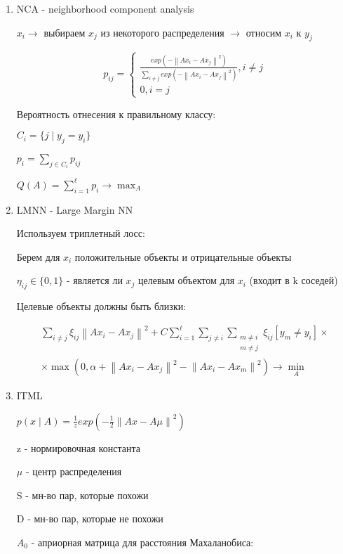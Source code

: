 \documentclass[a4paper, 12pt]{article}
\newcommand\norm[1]{\left\lVert#1\right\rVert}
\begin{document}
\begin{enumerate}
    \item NCA - neighborhood component analysis
    
    $x_i \rightarrow$ выбираем $x_j$ из некоторого распределения
    $\rightarrow$ относим $x_i$ к $y_j$

    \[p_{ij} = 
    \begin{cases}
        \frac{exp(- \norm{Ax_i - Ax_j}^2)}
        {\sum_{i \neq j} exp(- \norm{Ax_i - Ax_j}^2)}, i \neq j \\
        0, i = j
    \end{cases}\]

    Вероятность отнесения к правильному классу:

    $C_i = \{j \mid y_j = y_i\}$

    $p_i = \sum_{j \in C_i}p_{ij}$

    $Q(A) = \sum_{i = 1}^{\ell}p_i \rightarrow \max_{A}$
    \item LMNN - Large Margin NN
    
    Используем триплетный лосс:

    Берем для $x_i$ положительные объекты и отрицательные объекты

    $\eta_{ij} \in \{0, 1\}$ - является ли $x_j$ 
    целевым объектом для $x_i$ (входит в k соседей)

    Целевые объекты должны быть близки:

    \begin{multline*}
        \sum_{i \neq j} \xi_{ij}\norm{Ax_i - Ax_j}^2
        + C\sum_{i = 1}^{\ell}\sum_{j \neq i}
        \sum_{\substack{m \neq i \\ m \neq j}}\xi_{ij}
        [y_m \neq y_i] \times \\
        \times \max(0, \alpha + 
        \norm{Ax_i - Ax_j}^2 - \norm{Ax_i - Ax_m}^2)
        \rightarrow \min_{A}
    \end{multline*}

    \item ITML
    
    $p(x \mid A) = \frac{1}{z}exp(-\frac{1}{2}\norm{Ax - A\mu}^2)$

    z - нормировочная константа

    $\mu$ - центр распределения

    S - мн-во пар, которые похожи

    D - мн-во пар, которые не похожи

    $A_0$ - априорная матрица для расстояния Махаланобиса:


\end{enumerate}
\end{document}
